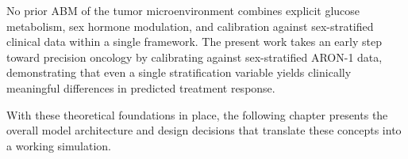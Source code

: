 No prior ABM of the tumor microenvironment combines explicit glucose metabolism, sex hormone modulation, and calibration against sex-stratified clinical data within a single framework.  The present work takes an early step toward precision oncology by calibrating against sex-stratified ARON-1 data, demonstrating that even a single stratification variable yields clinically meaningful differences in predicted treatment response.

With these theoretical foundations in place, the following chapter presents the overall model architecture and design decisions that translate these concepts into a working simulation.